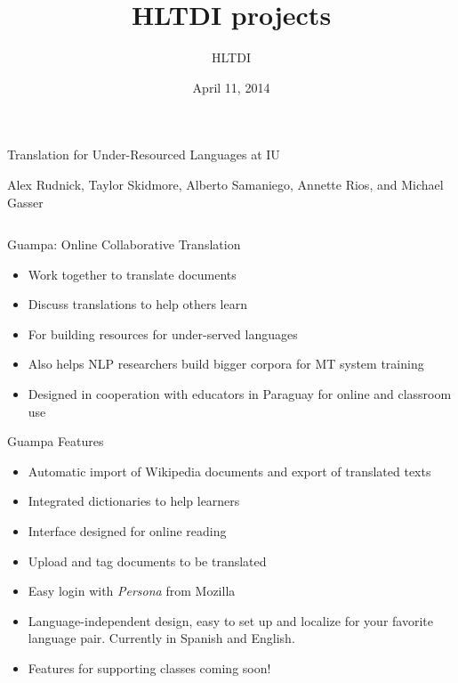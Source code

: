 \documentclass[final]{beamer}
\title{HLTDI projects}
\author{HLTDI}
\institute[Indiana University]{School of Informatics and Computing, Indiana University}
\date{April 11, 2014}
\begin{document}
\begin{frame}{} 
  \begin{block}
    {\centering \veryHuge Translation for Under-Resourced Languages at IU}\par
    \centering
    {\large Alex Rudnick, Taylor Skidmore, Alberto Samaniego, Annette Rios, and Michael Gasser}
    \par
  \end{block}

\begin{columns}[t]

  \begin{column}{.32\linewidth}

  \vfill
  \begin{block}{\large Guampa: Online Collaborative Translation}
    \centering
    \begin{itemize}
    \item Work together to translate documents
    \item Discuss translations to help others learn
    \item For building resources for under-served languages
    \item Also helps NLP researchers build bigger corpora for MT system training
    \item Designed in cooperation with educators in Paraguay for online and
    classroom use
    \end{itemize}
  \end{block}

  \begin{block}{\large Guampa Features}
    \centering
    \begin{itemize}
    \item Automatic import of Wikipedia documents and export of translated texts
    \item Integrated dictionaries to help learners
    \item Interface designed for online reading
    \item Upload and tag documents to be translated
    \item Easy login with \emph{Persona} from Mozilla
    \item Language-independent design, easy to set up and localize for your
    favorite language pair. Currently in Spanish and English.
    \item Features for supporting classes coming soon!
    \end{itemize}
  \end{block}
  \centering


\end{column}
\end{columns}
\end{frame}
\end{document}
